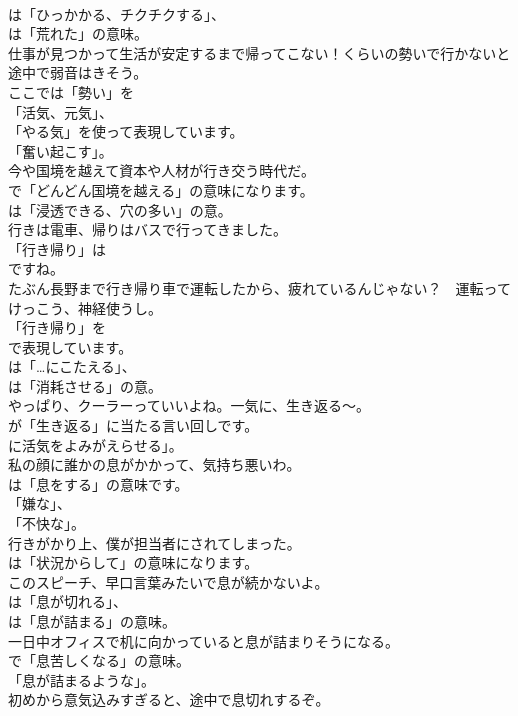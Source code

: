 \documentclass[8pt]{extreport}
\begin{document}
\begin{CJK}{UTF8}{min}
\\	は「ひっかかる、チクチクする」、
\\	は「荒れた」の意味。	
\\	仕事が見つかって生活が安定するまで帰ってこない！くらいの勢いで行かないと途中で弱音はきそう。 
\\	ここでは「勢い」を
\\	「活気、元気」、
\\	「やる気」を使って表現しています。
\\	「奮い起こす」。	
\\	今や国境を越えて資本や人材が行き交う時代だ。 
\\	で「どんどん国境を越える」の意味になります。
\\	は「浸透できる、穴の多い」の意。	
\\	行きは電車、帰りはバスで行ってきました。 
\\	「行き帰り」は
\\	ですね。	
\\	たぶん長野まで行き帰り車で運転したから、疲れているんじゃない？　運転ってけっこう、神経使うし。 
\\	「行き帰り」を 
\\	で表現しています。
\\	は「…にこたえる」、
\\	は「消耗させる」の意。	
\\	やっぱり、クーラーっていいよね。一気に、生き返る～。 
\\	が「生き返る」に当たる言い回しです。
\\	に活気をよみがえらせる」。	
\\	私の顔に誰かの息がかかって、気持ち悪いわ。 
\\	は「息をする」の意味です。
\\	「嫌な」、
\\	「不快な」。	
\\	行きがかり上、僕が担当者にされてしまった。 
\\	は「状況からして」の意味になります。	
\\	このスピーチ、早口言葉みたいで息が続かないよ。 
\\	は「息が切れる」、
\\	は「息が詰まる」の意味。	
\\	一日中オフィスで机に向かっていると息が詰まりそうになる。 
\\	で「息苦しくなる」の意味。
\\	「息が詰まるような」。	
\\	初めから意気込みすぎると、途中で息切れするぞ。 

\end{CJK}
\end{document}
